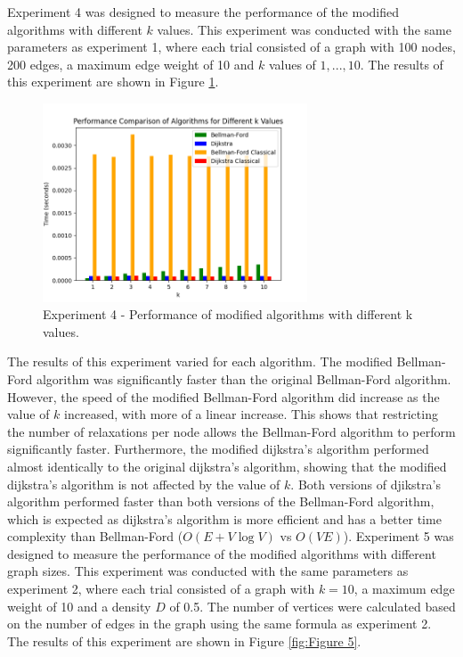 \documentclass{article}
\begin{document}
\begin{onehalfspace}
Experiment 4 was designed to measure the performance of the modified algorithms with different $k$ values.
This experiment was conducted with the same parameters as 
experiment 1, where each trial consisted of a graph with 100 nodes, 200 edges, a maximum edge weight of 10 and $k$ values of $1, ... , 10$.
The results of this experiment are shown in Figure \ref{fig:Figure 4}. 
\begin{figure}[H] 
    \centering
    \includegraphics[width=0.7\textwidth]{Figures/Performance_kvals.png} 
    \caption{\footnotesize Experiment 4 - Performance of modified algorithms with different k values.}
    \label{fig:Figure 4} 
\end{figure}

The results of this experiment varied for each algorithm. The modified Bellman-Ford algorithm was significantly faster
than the original Bellman-Ford algorithm. However, the speed of the modified Bellman-Ford algorithm did increase as the value of $k$ increased, with more of 
a linear increase. This shows that restricting the number of relaxations per node allows the Bellman-Ford algorithm to perform significantly faster. Furthermore, the modified dijkstra's algorithm performed almost identically to the original dijkstra's algorithm, showing that the modified dijkstra's algorithm is not affected by the value of $k$.
Both versions of djikstra's algorithm performed faster than both versions of the Bellman-Ford algorithm, which is expected as dijkstra's algorithm is more efficient and has a better time complexity than Bellman-Ford ($O(E + V \log V)$ vs $O(VE)$).
\smallskip
\newline
\indent
Experiment 5 was designed to measure the performance of the modified algorithms with different graph sizes.
This experiment was conducted with the same parameters as experiment 2, where each trial consisted of a graph with $k=10$, a maximum edge weight of 10 and a density $D$ of 0.5. The number of vertices were calculated based on the number of edges in the graph using the same formula as experiment 2.
The results of this experiment are shown in Figure \ref{fig:Figure 5}.


\end{onehalfspace}
\end{document}
